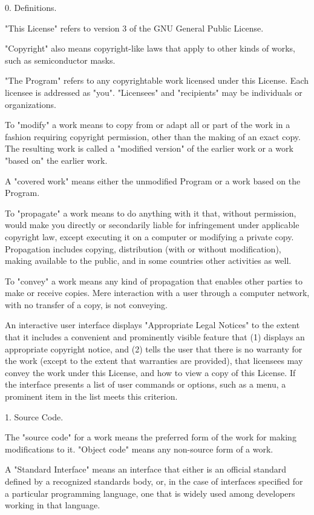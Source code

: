 \documentclass[parskip=half]{scrartcl}
\begin{document}
  0. Definitions.

  "This License" refers to version 3 of the GNU General Public License.

  "Copyright" also means copyright-like laws that apply to other kinds of
works, such as semiconductor masks.

  "The Program" refers to any copyrightable work licensed under this
License.  Each licensee is addressed as "you".  "Licensees" and
"recipients" may be individuals or organizations.

  To "modify" a work means to copy from or adapt all or part of the work
in a fashion requiring copyright permission, other than the making of an
exact copy.  The resulting work is called a "modified version" of the
earlier work or a work "based on" the earlier work.

  A "covered work" means either the unmodified Program or a work based
on the Program.

  To "propagate" a work means to do anything with it that, without
permission, would make you directly or secondarily liable for
infringement under applicable copyright law, except executing it on a
computer or modifying a private copy.  Propagation includes copying,
distribution (with or without modification), making available to the
public, and in some countries other activities as well.

  To "convey" a work means any kind of propagation that enables other
parties to make or receive copies.  Mere interaction with a user through
a computer network, with no transfer of a copy, is not conveying.

  An interactive user interface displays "Appropriate Legal Notices"
to the extent that it includes a convenient and prominently visible
feature that (1) displays an appropriate copyright notice, and (2)
tells the user that there is no warranty for the work (except to the
extent that warranties are provided), that licensees may convey the
work under this License, and how to view a copy of this License.  If
the interface presents a list of user commands or options, such as a
menu, a prominent item in the list meets this criterion.

  1. Source Code.

  The "source code" for a work means the preferred form of the work
for making modifications to it.  "Object code" means any non-source
form of a work.

  A "Standard Interface" means an interface that either is an official
standard defined by a recognized standards body, or, in the case of
interfaces specified for a particular programming language, one that
is widely used among developers working in that language.
\end{document}
